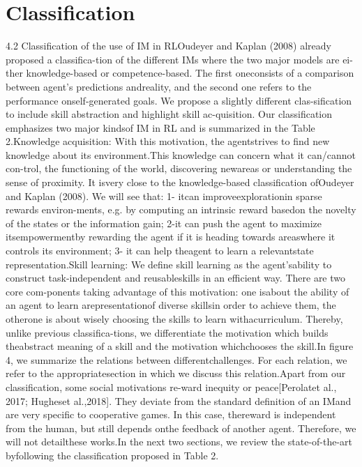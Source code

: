 \documentclass[draft,final]{vutinfth} %
\begin{document}
    \section{Classification}
    4.2 Classification of the use of IM in RLOudeyer and Kaplan (2008) already proposed a classifica-tion of the different IMs where the two major models are ei-ther knowledge-based or competence-based. The first oneconsists of a comparison between agent’s predictions andreality, and the second one refers to the performance onself-generated goals. We propose a slightly different clas-sification to include skill abstraction and highlight skill ac-quisition. Our classification emphasizes two major kindsof IM in RL and is summarized in the Table 2.Knowledge acquisition: With this motivation, the agentstrives to find new knowledge about its environment.This knowledge can concern what it can/cannot con-trol, the functioning of the world, discovering newareas or understanding the sense of proximity. It isvery close to the knowledge-based classification ofOudeyer and Kaplan (2008). We will see that: 1- itcan improveexplorationin sparse rewards environ-ments, e.g. by computing an intrinsic reward basedon the novelty of the states or the information gain; 2-it can push the agent to maximize itsempowermentby rewarding the agent if it is heading towards areaswhere it controls its environment; 3- it can help theagent to learn a relevantstate representation.Skill learning: We define skill learning as the agent’sability to construct task-independent and reusableskills in an efficient way. There are two core com-ponents taking advantage of this motivation: one isabout the ability of an agent to learn arepresentationof diverse skillsin order to achieve them, the otherone is about wisely choosing the skills to learn withacurriculum. Thereby, unlike previous classifica-tions, we differentiate the motivation which builds theabstract meaning of a skill and the motivation whichchooses the skill.In figure 4, we summarize the relations between differentchallenges. For each relation, we refer to the appropriatesection in which we discuss this relation.Apart from our classification, some social motivations re-ward inequity or peace[Perolatet al., 2017; Hugheset al.,2018]. They deviate from the standard definition of an IMand are very specific to cooperative games. In this case, thereward is independent from the human, but still depends onthe feedback of another agent. Therefore, we will not detailthese works.In the next two sections, we review the state-of-the-art byfollowing the classification proposed in Table 2.
\end{document}
